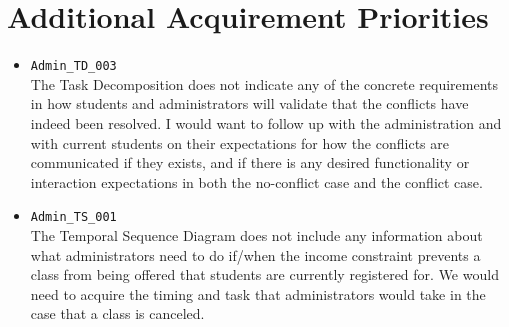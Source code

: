 \documentclass{article}
\begin{document}
	\section*{Additional Acquirement Priorities}
	\begin{itemize}
	\item \texttt{Admin\_TD\_003}\\
		The Task Decomposition does not indicate any of the concrete requirements in how students and administrators will validate that the conflicts have indeed been resolved. I would want to follow up with the administration and with current students on their expectations for how the conflicts are communicated if they exists, and if there is any desired functionality or interaction expectations in both the no-conflict case and the conflict case.\\
	\item \texttt{Admin\_TS\_001}\\
		The Temporal Sequence Diagram does not include any information about what administrators need to do if/when the income constraint prevents a class from being offered that students are currently registered for. We would need to acquire the timing and task that administrators would take in the case that a class is canceled.\\
	\end{itemize}
\end{document}
